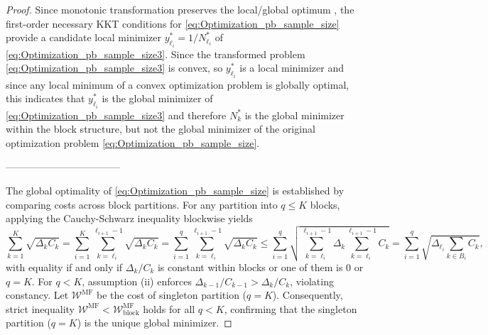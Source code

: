 \begin{proof}
 Since monotonic transformation preserves the local/global optimum \cite{AgVeDiBo:2018}, the first-order necessary KKT conditions for \eqref{eq:Optimization_pb_sample_size}  provide a candidate local minimizer $y_{\ell_i}^* = 1/N_{\ell_i}^*$ of \eqref{eq:Optimization_pb_sample_size3}. Since the transformed problem \eqref{eq:Optimization_pb_sample_size3} is convex, so $y_{\ell_i}^*$ is a local minimizer and since any local minimum of a convex optimization problem is globally optimal, this indicates that $y_{\ell_i}^*$ is the global minimizer of \eqref{eq:Optimization_pb_sample_size3} and therefore $N_k^*$ is the global minimizer within the block structure, but not the global minimizer of the original optimization problem \eqref{eq:Optimization_pb_sample_size}.

-----------------------------------






\medskip
{}

The global optimality of \eqref{eq:Optimization_pb_sample_size} is established by comparing costs across block partitions. For any partition into $q \leq K$ blocks, applying the Cauchy-Schwarz inequality blockwise yields
%
\[
\sum_{k=1}^K \sqrt{\Delta_k C_k}  = \sum_{i=1}^K \sum_{k=\ell_i}^{\ell_{i+1}-1} \sqrt{\Delta_k C_k} = \sum_{i=1}^q \sum_{k=\ell_i}^{\ell_{i+1}-1} \sqrt{\Delta_k C_k} \le \sum_{i=1}^q \sqrt{ \sum_{k=\ell_i}^{\ell_{i+1}-1}\Delta_k \sum_{k=\ell_i}^{\ell_{i+1}-1} C_k } = \sum_{i=1}^q \sqrt{ \Delta_{\ell_i} \sum_{k\in B_i} C_k },
\]
%
with equality if and only if $\Delta_k / C_k$ is constant within blocks or one of them is 0 or $q=K$. For $q < K$, assumption (ii) enforces $\Delta_{k-1}/C_{k-1} > \Delta_k/C_k$, violating constancy. Let $\mathcal{W}^{\text{MF}}$ be the cost of singleton partition ($q=K$). Consequently, strict inequality $\mathcal{W}^{\text{MF}} < \mathcal{W}_{\text{block}}^{\text{MF}}$ holds for all $q<K$, confirming that the singleton partition ($q=K$) is the unique global minimizer. 


\end{proof}
